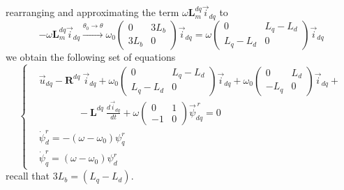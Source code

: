 \documentclass[11pt,a4paper]{article}
\numberwithin{equation}{section}
\theoremstyle{it}
\theoremstyle{definition}
\begin{document}
\begin{onehalfspace}
rearranging and approximating the term $\omega\mathbf{L}_m^{dq}\vec{i}_{dq}$ to 
$$-\omega\mathbf{L}_m^{dq}\vec{i}_{dq}
\xrightarrow{\theta_0\rightarrow\theta} \omega_0\begin{pmatrix} 0 & 3L_b\\ 3L_b & 0 \end{pmatrix}\vec{i}_{dq} = \omega\begin{pmatrix} 0 & L_q-L_d\\ L_q-L_d & 0 \end{pmatrix}\vec{i}_{dq}$$
we obtain the following set of equations  
\begin{equation}\label{eqdq}
	\left\lbrace \begin{aligned}
		& \vec{u}_{dq}-\mathbf{R}^{dq}\ \vec{i}_{dq} + \omega_0 \begin{pmatrix} 0 & L_q-L_d\\ L_q-L_d & 0 \end{pmatrix}\vec{i}_{dq} + \omega_0\begin{pmatrix} 0 & L_d\\ -L_q & 0 \end{pmatrix}\vec{i}_{dq} + \\[6pt]
		&\qquad\qquad-\mathbf{L}^{dq}\ \frac{d\vec{i}_{dq}}{dt} + \omega\begin{pmatrix} 0 & 1\\-1 & 0 \end{pmatrix}\vec{\psi}_{dq}^{\,r} = 0\\[6pt]
		& \dot{\psi}_d^r = -\left( \omega-\omega_0\right)\psi_q^r \\[6pt]
		&\dot{\psi}_q^r = \left( \omega-\omega_0\right)\psi_d^r 
	\end{aligned} \right. 
\end{equation}
recall that $3L_b=(L_q-L_d)$.


\end{onehalfspace}
\end{document}
